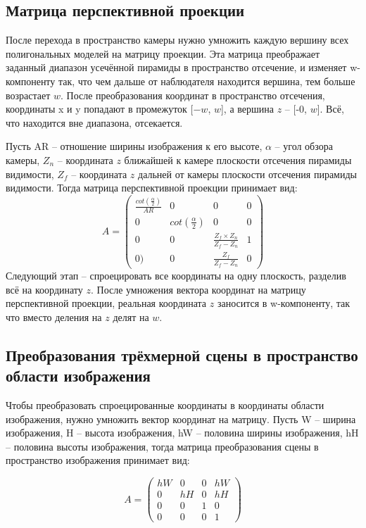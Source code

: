 \subsection{Матрица перспективной проекции}
После перехода в пространство камеры нужно умножить каждую вершину всех полигональных моделей на матрицу проекции. 
Эта матрица преображает заданный диапазон усечённой пирамиды в пространство отсечение, и изменяет w-компоненту так, что чем дальше от наблюдателя находится вершина, тем больше возрастает $ w $. 
После преобразования координат в пространство отсечения, координаты x и y попадают в промежуток [$-w$, $w$], а вершина $z$ – [-0, $w$]. 
Всё, что находится вне диапазона, отсекается.

Пусть AR – отношение ширины изображения к его высоте, $\alpha$ – угол обзора камеры, $Z_n$ – координата $z$ ближайшей к камере плоскости отсечения пирамиды видимости, 
$ Z_f $ – координата $z$ дальней от камеры плоскости отсечения пирамиды видимости. 
Тогда матрица перспективной проекции принимает вид:
\begin{equation*}
A = \left(
\begin{array}{cccc}
\frac{cot(\frac{\alpha}{2})}{AR} & 0 & 0 & 0\\
0 & cot(\frac{\alpha}{2}) & 0 & 0 \\
0 & 0 & \frac{Z_f \times Z_n}{Z_f - Z_n} & 1 \\
0) & 0 & \frac{Z_f}{Z_f - Z_n} & 0
\end{array}
\right)
\end{equation*}
Следующий этап – спроецировать все координаты на одну плоскость, разделив всё на координату $z$. После умножения вектора координат на матрицу перспективной проекции, реальная координата $z$ заносится в w-компоненту, так что вместо деления на $z$ делят на $w$.

\subsection{Преобразования трёхмерной сцены в пространство области изображения}
Чтобы преобразовать спроецированные координаты в координаты области изображения, нужно умножить вектор координат на матрицу. Пусть W – ширина изображения, H – высота изображения, hW – половина ширины изображения, hH – половина высоты изображения, тогда матрица преобразования сцены в пространство изображения принимает вид:

\begin{equation*}
A = \left(
\begin{array}{cccc}
hW & 0 & 0 & hW\\
0 & hH & 0 & hH \\
0 & 0 & 1 & 0 \\
0 & 0 & 0 & 1
\end{array}
\right)
\end{equation*}

